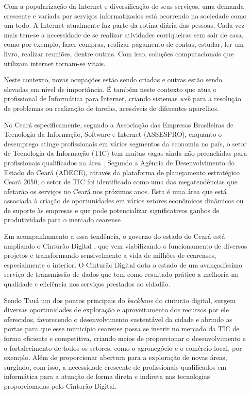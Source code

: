 \documentclass[
	12pt,				%
	openright,			%
	twoside,			%
	a4paper,			%
	chapter=TITLE,		%
	english,			%
	french,				%
	spanish,			%
	brazil,				%
	]{abntex2}
\begin{document}
Com a popularização da Internet e diversificação de seus serviços, uma demanda crescente e variada por serviços informatizados está ocorrendo na sociedade como um todo.  A Internet atualmente faz parte da rotina diária das pessoas. Cada vez mais tem-se a necessidade de se realizar atividades corriqueiras sem sair de casa, como por exemplo, fazer compras, realizar pagamento de contas, estudar, ler um livro, realizar reuniões, dentre outras. Com isso, soluções computacionais que utilizam internet tornam-se vitais.


Neste contexto, novas ocupações estão sendo criadas e outras estão sendo
elevadas em nível de importância. É também neste contexto que atua o
profissional de Informática para Internet, criando sistemas \emph{web} para a
resolução de problemas ou realização de tarefas, acessíveis de diferentes aparelhos.

No Ceará especificamente, segundo a Associação das Empresas Brasileiras de Tecnologia da Informação, Software e Internet (ASSESPRO), enquanto o desemprego atinge profissionais em vários segmentos da economia no país, o setor de Tecnologia da Informação (TIC)  tem muitas vagas ainda não preenchidas para profissionais qualificados na área \cite{estadao2019}. Segundo a Agência de Desenvolvimento do Estado do Ceará (ADECE), através da plataforma de planejamento estratégico Ceará 2050, o setor de TIC foi identificado como uma das megatendências que afetarão os serviços no Ceará nos próximos anos. Esta é uma área que está associada à criação de oportunidades em vários setores econômicos dinâmicos ou de suporte às empresas e que pode potencializar significativos ganhos de produtividade para o mercado cearense~\cite{adece2019}.

Em acompanhamento a essa tendência, o governo do estado do Ceará está ampliando o Cinturão Digital \cite{diario2018cinturao}, que vem viabilizando o funcionamento de diversos projetos e transformando sensivelmente a vida de milhões de cearenses, especialmente o interior. O Cinturão Digital dota o estado de um avançadíssimo serviço de transmissão de dados que tem como resultado prático a melhoria na qualidade e eficiência nos serviços prestados ao cidadão. %


Sendo Tauá um dos pontos principais do \emph{backbone} do cinturão digital, surgem diversas oportunidades de exploração e aproveitamento dos recursos por ele oferecidos, favorecendo o desenvolvimento sustentável da cidade e abrindo as portas para que esse município cearense possa se inserir no mercado da TIC de forma eficiente e competitiva, criando meios de proporcionar o desenvolvimento e o fortalecimento   de todos os setores, como o agronegócio e o comércio local, por exemplo. Além de proporcionar abertura para a exploração de novas áreas, surgindo, com isso,  a necessidade crescente de profissionais qualificados em informática para a atuação de forma direta e indireta nas tecnologias proporcionadas pelo Cinturão Digital.
\end{document}
